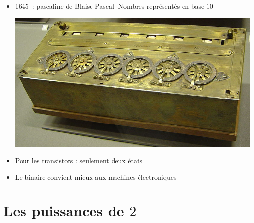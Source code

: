 \begin{frame}




\begin{itemize}
  \item<2-> 1645~:  pascaline de Blaise Pascal. Nombres représentés en base $10$


\begin{center}
\includegraphics[scale=0.25]{Pascaline.jpg}
\end{center}  

  \item<3-> Pour les transistors : seulement deux états
  
  \item<4-> Le binaire convient mieux aux machines électroniques
\end{itemize}

\end{frame}


\section{Les puissances de $2$}




